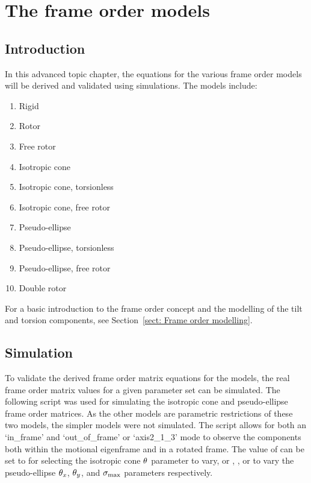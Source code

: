 
\chapter{The frame order models}
\label{ch: The frame order models}





\section{Introduction}

In this advanced topic chapter, the equations for the various frame order models will be derived and validated using simulations.  The models include:
\begin{enumerate}
    \item Rigid
    \item Rotor
    \item Free rotor
    \item Isotropic cone
    \item Isotropic cone, torsionless
    \item Isotropic cone, free rotor
    \item Pseudo-ellipse
    \item Pseudo-ellipse, torsionless
    \item Pseudo-ellipse, free rotor
    \item Double rotor
\end{enumerate}

For a basic introduction to the frame order concept and the modelling of the tilt and torsion components, see Section~\ref{sect: Frame order modelling}.



\section{Simulation}
\label{sect: frame order simulation}

To validate the derived frame order matrix equations for the models, the real frame order matrix values for a given parameter set can be simulated.
The following script was used for simulating the isotropic cone and pseudo-ellipse frame order matrices.
As the other models are parametric restrictions of these two models, the simpler models were not simulated.
The script allows for both an `in\_frame' and `out\_of\_frame' or `axis2\_1\_3' mode to observe the components both within the motional eigenframe and in a rotated frame.
The value of  can be set to  for selecting the isotropic cone $\theta$ parameter to vary, or , , or  to vary the pseudo-ellipse $\theta_x$, $\theta_y$, and $\sigma_\textrm{max}$ parameters respectively.

